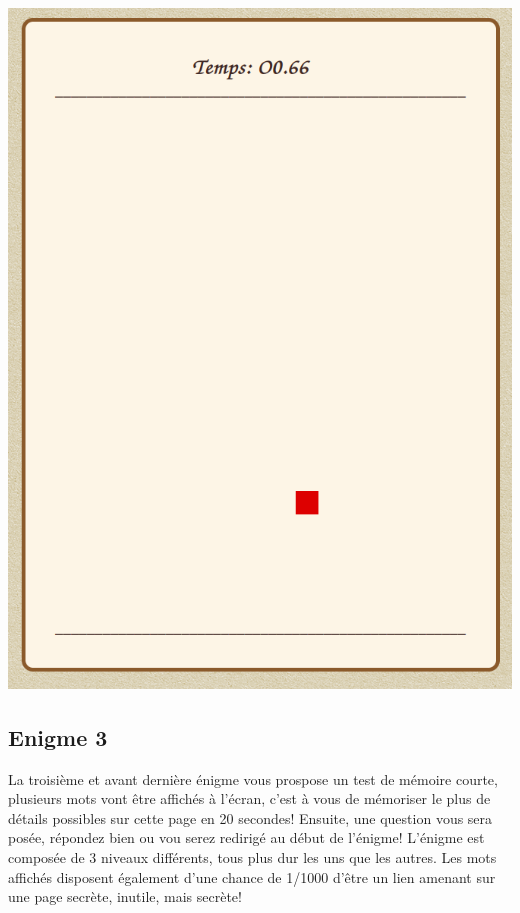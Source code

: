 \documentclass[12pt,a4paper]{article}
\begin{document}
\includegraphics[scale=0.45]{enigme2.png}

\newpage
\subsection{Enigme 3}
La troisième et avant dernière énigme vous prospose un test de mémoire courte, plusieurs mots vont être affichés à l'écran, c'est à vous de mémoriser le plus de détails possibles sur cette page en 20 secondes! Ensuite, une question vous sera posée, répondez bien ou vou serez redirigé au début de l'énigme! L'énigme est composée de 3 niveaux différents, tous plus dur les uns que les autres. Les mots affichés disposent également d'une chance de 1/1000 d'être un lien amenant sur une page secrète, inutile, mais secrète! \\
\end{document}
